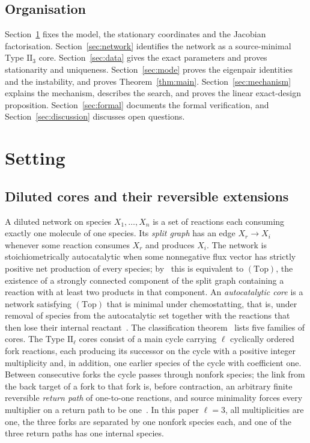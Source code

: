 \documentclass[11pt,a4paper]{article}
\theoremstyle{plain}
\theoremstyle{definition}
\theoremstyle{remark}
\numberwithin{equation}{section}
\newcommand{\II}{\mathrm{II}}
\newcommand{\Top}{\mathrm{(Top)}}
\begin{document}
\subsection*{Organisation}
Section~\ref{sec:setting} fixes the model, the stationary coordinates and the Jacobian factorisation. Section~\ref{sec:network} identifies the network as a source-minimal Type $\II_3$ core. Section~\ref{sec:data} gives the exact parameters and proves stationarity and uniqueness. Section~\ref{sec:mode} proves the eigenpair identities and the instability, and proves Theorem~\ref{thm:main}. Section~\ref{sec:mechanism} explains the mechanism, describes the search, and proves the linear exact-design proposition. Section~\ref{sec:formal} documents the formal verification, and Section~\ref{sec:discussion} discusses open questions.

\section{Setting}\label{sec:setting}

\subsection{Diluted cores and their reversible extensions}
A diluted network on species $X_1,\dots,X_n$ is a set of reactions each consuming exactly one molecule of one species. Its \emph{split graph} has an edge $X_r\to X_i$ whenever some reaction consumes $X_r$ and produces $X_i$. The network is stoichiometrically autocatalytic when some nonnegative flux vector has strictly positive net production of every species; by~\cite{UN22} this is equivalent to $\Top$, the existence of a strongly connected component of the split graph containing a reaction with at least two products in that component. An \emph{autocatalytic core} is a network satisfying $\Top$ that is minimal under chemostatting, that is, under removal of species from the autocatalytic set together with the reactions that then lose their internal reactant~\cite[\S2]{NNU26}. The classification theorem~\cite[Theorem~3.1]{NNU26} lists five families of cores. The Type $\II_\ell$ cores consist of a main cycle carrying $\ell$ cyclically ordered fork reactions, each producing its successor on the cycle with a positive integer multiplicity and, in addition, one earlier species of the cycle with coefficient one. Between consecutive forks the cycle passes through nonfork species; the link from the back target of a fork to that fork is, before contraction, an arbitrary finite reversible \emph{return path} of one-to-one reactions, and source minimality forces every multiplier on a return path to be one~\cite[Lemma~2.4]{TypeIImixed}. In this paper $\ell=3$, all multiplicities are one, the three forks are separated by one nonfork species each, and one of the three return paths has one internal species.
\end{document}
